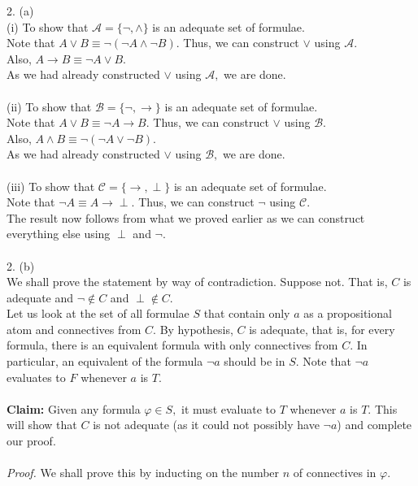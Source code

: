 \documentclass{article}
\begin{document}
2. (a)\\
(i) To show that $\mathcal{A} = \{\neg, \wedge\}$ is an adequate set of formulae. \\
Note that $A\vee B \equiv \neg(\neg A \wedge \neg B).$ Thus, we can construct $\vee$ using $\mathcal{A}.$ \\
Also, $A \to B \equiv \neg A \vee B.$ \\
As we had already constructed $\vee$ using $\mathcal{A},$ we are done.\\~\\
(ii) To show that $\mathcal{B} = \{\neg, \to\}$ is an adequate set of formulae.\\
Note that $A\vee B \equiv \neg A \to B.$ Thus, we can construct $\vee$ using $\mathcal{B}.$ \\
Also, $A \wedge B\equiv \neg(\neg A\vee \neg B).$ \\
As we had already constructed $\vee$ using $\mathcal{B},$ we are done.\\~\\
(iii) To show that $\mathcal{C} = \{\to, \perp\}$ is an adequate set of formulae.\\
Note that $\neg A \equiv A \to \perp.$ Thus, we can construct $\neg$ using $\mathcal{C}.$\\
The result now follows from what we proved earlier as we can construct everything else using $\perp$ and $\neg.$ \\~\\
%
2. (b)\\
We shall prove the statement by way of contradiction. Suppose not. That is, $C$ is adequate and $\neg \not\in C$ and $\perp\not\in C.$\\
Let us look at the set of all formulae $S$ that contain only $a$ as a propositional atom and connectives from $C.$ By hypothesis, $C$ is adequate, that is, for every formula, there is an equivalent formula with only connectives from $C.$ In particular, an equivalent of the formula $\neg a$ should be in $S.$ Note that $\neg a$ evaluates to $F$ whenever $a$ is $T.$\\~\\
\textbf{Claim:} Given any formula $\varphi \in S,$ it must evaluate to $T$ whenever $a$ is $T.$ This will show that $C$ is not adequate (as it could not possibly have $\neg a$) and complete our proof.\\~\\
\emph{Proof.} We shall prove this by inducting on the number $n$ of connectives in $\varphi.$\\
\end{document}
